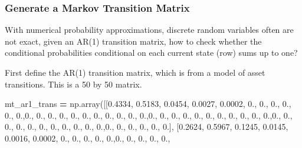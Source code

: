 \documentclass[
]{book}
\newenvironment{Shaded}{\begin{snugshade}}{\end{snugshade}}
\newcommand{\FloatTok}[1]{\textcolor[rgb]{0.00,0.00,0.81}{#1}}
\newcommand{\NormalTok}[1]{#1}
\newcommand{\OperatorTok}[1]{\textcolor[rgb]{0.81,0.36,0.00}{\textbf{#1}}}
\begin{document}
\hypertarget{generate-a-markov-transition-matrix}{%
\subsubsection{Generate a Markov Transition Matrix}\label{generate-a-markov-transition-matrix}}

With numerical probability approximations, discrete random variables often are not exact, given an AR(1) transition matrix, how to check whether the conditional probabilities conditional on each current state (row) sums up to one?

First define the AR(1) transition matrix, which is from a model of asset transitions. This is a 50 by 50 matrix.

\begin{Shaded}
\begin{Highlighting}[]
\NormalTok{mt\_ar1\_trans }\OperatorTok{=}\NormalTok{ np.array([[}\FloatTok{0.4334}\NormalTok{, }\FloatTok{0.5183}\NormalTok{, }\FloatTok{0.0454}\NormalTok{, }\FloatTok{0.0027}\NormalTok{, }\FloatTok{0.0002}\NormalTok{, }\FloatTok{0.}\NormalTok{, }\FloatTok{0.}\NormalTok{, }\FloatTok{0.}\NormalTok{, }\FloatTok{0.}\NormalTok{, }\FloatTok{0.}\NormalTok{, }\FloatTok{0.}\NormalTok{,}\FloatTok{0.}\NormalTok{,}
\FloatTok{0.}\NormalTok{, }\FloatTok{0.}\NormalTok{, }\FloatTok{0.}\NormalTok{, }\FloatTok{0.}\NormalTok{, }\FloatTok{0.}\NormalTok{, }\FloatTok{0.}\NormalTok{, }\FloatTok{0.}\NormalTok{, }\FloatTok{0.}\NormalTok{, }\FloatTok{0.}\NormalTok{, }\FloatTok{0.}\NormalTok{,}\FloatTok{0.}\NormalTok{, }\FloatTok{0.}\NormalTok{, }\FloatTok{0.}\NormalTok{, }\FloatTok{0.}\NormalTok{, }\FloatTok{0.}\NormalTok{, }\FloatTok{0.}\NormalTok{, }\FloatTok{0.}\NormalTok{, }\FloatTok{0.}\NormalTok{, }\FloatTok{0.}\NormalTok{, }\FloatTok{0.}\NormalTok{,}
\FloatTok{0.}\NormalTok{,}\FloatTok{0.}\NormalTok{, }\FloatTok{0.}\NormalTok{, }\FloatTok{0.}\NormalTok{, }\FloatTok{0.}\NormalTok{, }\FloatTok{0.}\NormalTok{, }\FloatTok{0.}\NormalTok{, }\FloatTok{0.}\NormalTok{, }\FloatTok{0.}\NormalTok{, }\FloatTok{0.}\NormalTok{, }\FloatTok{0.}\NormalTok{, }\FloatTok{0.}\NormalTok{,}\FloatTok{0.}\NormalTok{, }\FloatTok{0.}\NormalTok{, }\FloatTok{0.}\NormalTok{, }\FloatTok{0.}\NormalTok{, }\FloatTok{0.}\NormalTok{, }\FloatTok{0.}\NormalTok{], [}\FloatTok{0.2624}\NormalTok{,}
\FloatTok{0.5967}\NormalTok{, }\FloatTok{0.1245}\NormalTok{, }\FloatTok{0.0145}\NormalTok{, }\FloatTok{0.0016}\NormalTok{, }\FloatTok{0.0002}\NormalTok{, }\FloatTok{0.}\NormalTok{, }\FloatTok{0.}\NormalTok{, }\FloatTok{0.}\NormalTok{, }\FloatTok{0.}\NormalTok{, }\FloatTok{0.}\NormalTok{,}\FloatTok{0.}\NormalTok{, }\FloatTok{0.}\NormalTok{, }\FloatTok{0.}\NormalTok{, }\FloatTok{0.}\NormalTok{, }\FloatTok{0.}\NormalTok{,}

\end{Highlighting}
\end{Shaded}
\end{document}
